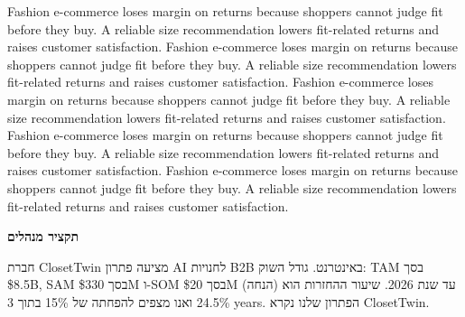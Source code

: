 \documentclass[a4paper,11pt]{article}
\begin{document}
Fashion e-commerce loses margin on returns because shoppers cannot judge fit before they buy. A reliable size recommendation lowers fit-related returns and raises customer satisfaction. Fashion e-commerce loses margin on returns because shoppers cannot judge fit before they buy. A reliable size recommendation lowers fit-related returns and raises customer satisfaction. Fashion e-commerce loses margin on returns because shoppers cannot judge fit before they buy. A reliable size recommendation lowers fit-related returns and raises customer satisfaction. Fashion e-commerce loses margin on returns because shoppers cannot judge fit before they buy. A reliable size recommendation lowers fit-related returns and raises customer satisfaction. Fashion e-commerce loses margin on returns because shoppers cannot judge fit before they buy. A reliable size recommendation lowers fit-related returns and raises customer satisfaction. 
\newpage
\begin{otherlanguage}{hebrew}
{\bfseries\Large תקציר מנהלים}\par
חברת ClosetTwin מציעה פתרון AI לחנויות B2B באינטרנט. גודל השוק: TAM בסך \$8.5B, SAM בסך \$330M ו-SOM בסך \$20M (הנחה) עד שנת 2026. שיעור ההחזרות הוא 24.5\% ואנו מצפים להפחתה של 15\% בתוך 3 years. הפתרון שלנו נקרא ClosetTwin.
\end{otherlanguage}
\end{document}
